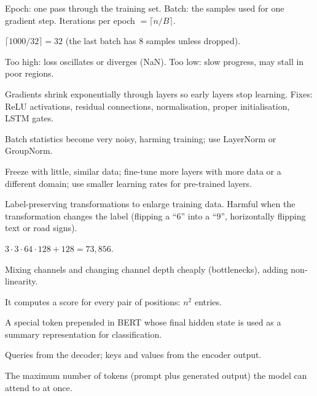 \A Epoch: one pass through the training set. Batch: the samples used for one gradient step. Iterations per epoch $=\lceil n/B\rceil$.

\A $\lceil1000/32\rceil=32$ (the last batch has 8 samples unless dropped).

\A Too high: loss oscillates or diverges (NaN). Too low: slow progress, may stall in poor regions.

\A Gradients shrink exponentially through layers so early layers stop learning. Fixes: ReLU activations, residual connections, normalisation, proper initialisation, LSTM gates.

\A Batch statistics become very noisy, harming training; use LayerNorm or GroupNorm.

\A Freeze with little, similar data; fine-tune more layers with more data or a different domain; use smaller learning rates for pre-trained layers.

\A Label-preserving transformations to enlarge training data. Harmful when the transformation changes the label (flipping a ``6'' into a ``9'', horizontally flipping text or road signs).

\A $3\cdot3\cdot64\cdot128+128=73{,}856$.

\A Mixing channels and changing channel depth cheaply (bottlenecks), adding non-linearity.

\A It computes a score for every pair of positions: $n^2$ entries.

\A A special token prepended in BERT whose final hidden state is used as a summary representation for classification.

\A Queries from the decoder; keys and values from the encoder output.

\A The maximum number of tokens (prompt plus generated output) the model can attend to at once.

